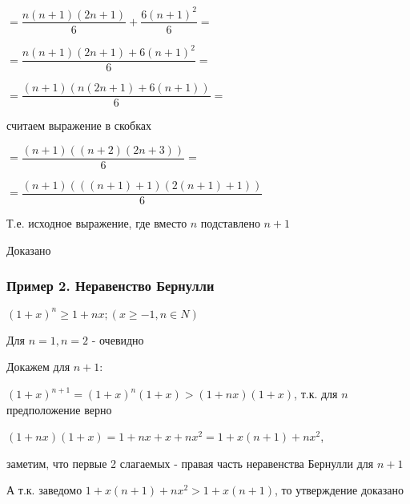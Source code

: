 $ = \dfrac{n(n+1)(2n+1)}{6} + \dfrac{6(n+1)^2}{6} = $

$= \dfrac{n(n+1)(2n+1) + 6(n+1)^2}{6} = $

$ = \dfrac{(n+1)( n(2n+1) + 6(n+1) )}{6} = $

считаем выражение в скобках

$ = \dfrac{(n+1)( (n+2)(2n+3) )}{6} = $

$ = \dfrac{(n+1)( ((n+1) + 1) (2(n+1) + 1) )}{6}$

Т.е. исходное выражение, где вместо $ n $  подставлено $ n+1 $

Доказано

\subsubsection{Пример 2. Неравенство Бернулли}

$(1+x)^n \ge 1 + nx; (x \ge -1, n \in N  ) $

Для $ n = 1, n = 2 $ - очевидно

Докажем для $n+1$:

$ (1+x)^{n+1} = (1+x)^{n}(1+x) > (1+nx)(1+x) $, т.к. для $ n $ предположение верно

$ (1+nx)(1+x) = 1 + nx + x + nx^{2} = 1+ x(n+1) + nx^{2} $, 

заметим, что первые 2 слагаемых  - правая часть неравенства Бернулли для $ n+1 $

А т.к. заведомо $ 1 + x(n+1) + nx^{2} > 1 + x(n+1) $, то утверждение доказано
